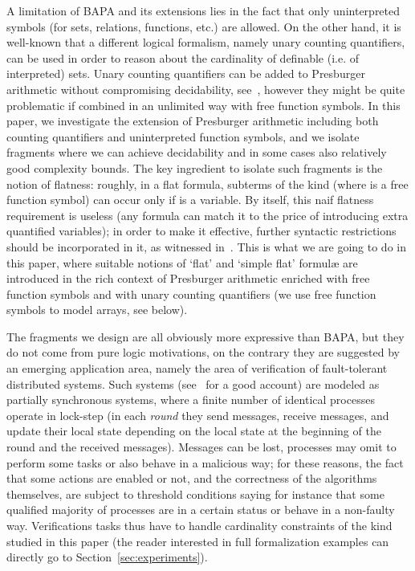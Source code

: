 \documentclass[11pt,a4paper]{article}
\newcommand{\formulae}{formul\ae\xspace}
\begin{document}
A limitation of BAPA and its extensions lies in the fact that only uninterpreted symbols (for sets, relations, functions, etc.) are allowed. On the other hand, 
it is well-known that a different logical formalism, namely
unary counting quantifiers, can be used  in order to reason about the cardinality of definable (i.e. of interpreted) sets.  
Unary counting quantifiers can be added to Presburger arithmetic without compromising  decidability, see~\cite{schweikhart}, 
however they might be quite problematic if combined in an unlimited way with free function symbols.
In this paper, we investigate the extension of Presburger arithmetic including both counting quantifiers and uninterpreted function symbols, and we isolate fragments where we can achieve decidability and in some cases also relatively good complexity bounds. The key ingredient to isolate such fragments is the notion of flatness: roughly, in a flat formula, subterms of the kind  (where  is a free function symbol) can occur only if  is a variable. By itself, this naif flatness requirement is useless (any formula can match it to the price of introducing extra quantified variables); 
in order to make it effective, further 
 syntactic restrictions should be incorporated in it, as witnessed in~\cite{AlbertiGS14}. This is what we are going to do in  this paper, where suitable notions of `flat' and `simple flat' \formulae are introduced
 in the rich context of Presburger arithmetic enriched with free function symbols  and with unary counting quantifiers (we use free function symbols to model arrays, see below).

The fragments we design are all obviously more expressive than BAPA, but they do not come from pure logic motivations, on the contrary they are suggested by an emerging  application area, 
namely the area of verification of fault-tolerant distributed systems.
Such systems (see~\cite{zufferey} for a good account)  are modeled as partially synchronous systems, where a finite number of identical
 processes operate  in lock-step (in each \textit{round} they send messages,
receive messages, and update their local state depending on the local state at the beginning of
the round and the received messages). Messages can be lost, processes may omit to perform some tasks or also behave in a malicious way; for these reasons, 
the fact that some actions  are enabled or not, and the correctness of the algorithms themselves,  are subject to threshold conditions saying for instance  that
some qualified majority of processes are in a certain status or behave in a non-faulty way. Verifications tasks thus have to handle  cardinality constraints
of the kind studied in this paper (the reader interested in full formalization examples can directly go to Section~\ref{sec:experiments}).
\end{document}
